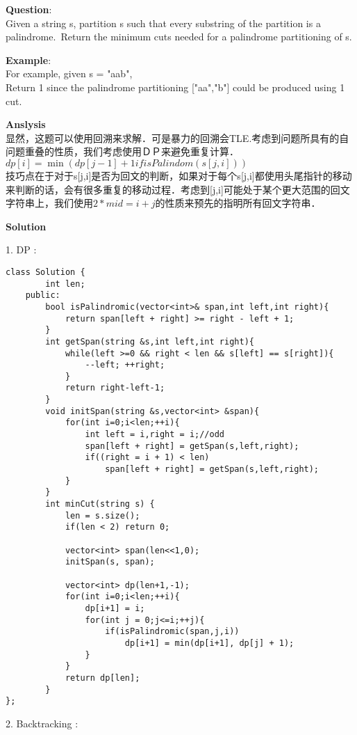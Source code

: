 \begin{description}
    \item{\textbf{Question}}:\\%
		Given a string s, partition s such that every substring of the partition is a palindrome.\
		Return the minimum cuts needed for a palindrome partitioning of s.\\

    \item{\textbf{Example}}:\\
		For example, given s = "aab",\\
		Return 1 since the palindrome partitioning ["aa","b"] could be produced using 1 cut.\\

    \item{\textbf{Anslysis}}\\
		显然，这题可以使用回溯来求解．可是暴力的回溯会TLE.考虑到问题所具有的自问题重叠的性质，我们考虑使用ＤＰ来避免重复计算．\\
		$dp[i] = \min(dp[j-1] + 1 ifisPalindom(s[j,i]))$\\
		技巧点在于对于s[j,i]是否为回文的判断，如果对于每个s[j,i]都使用头尾指针的移动来判断的话，会有很多重复的移动过程．考虑到[j,i]可能处于某个更大范围的回文字符串上，我们使用$2 * mid = i + j$的性质来预先的指明所有回文字符串．

    \item{\textbf{Solution}}\\
	\item{1. DP} : \\
		\begin{lstlisting}
class Solution {
		int len;
	public:
		bool isPalindromic(vector<int>& span,int left,int right){
			return span[left + right] >= right - left + 1;
		}
		int getSpan(string &s,int left,int right){
			while(left >=0 && right < len && s[left] == s[right]){
				--left;	++right;
			}
			return right-left-1;
		}
		void initSpan(string &s,vector<int> &span){
			for(int i=0;i<len;++i){
				int left = i,right = i;//odd
				span[left + right] = getSpan(s,left,right);
				if((right = i + 1) < len)
					span[left + right] = getSpan(s,left,right);
			}
		}
		int minCut(string s) {
			len = s.size();
			if(len < 2)	return 0;

			vector<int> span(len<<1,0);
			initSpan(s, span);

			vector<int> dp(len+1,-1);
			for(int i=0;i<len;++i){
				dp[i+1] = i;
				for(int j = 0;j<=i;++j){
					if(isPalindromic(span,j,i))
						dp[i+1] = min(dp[i+1], dp[j] + 1);
				}
			}
			return dp[len];
		}
};
		\end{lstlisting}
	\item{2. Backtracking} : \\
		\begin{lstlisting}
		\end{lstlisting}
\end{description}

